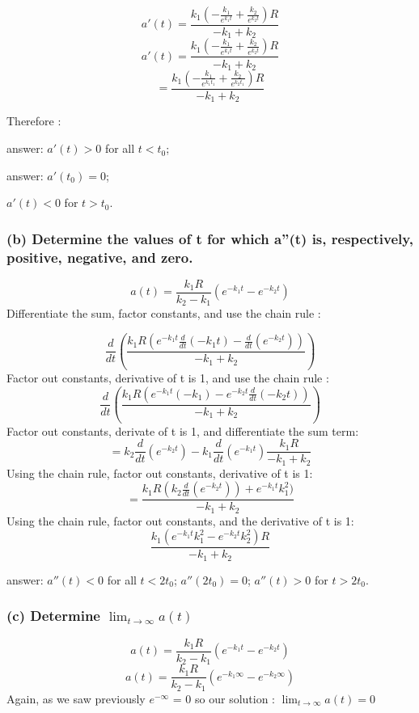 \documentclass[]{article}
\begin{document}
\[a'(t) = \frac{k_1 ( -\frac{k_1}{e^{k_1t}}+\frac{k_2}{e^{k_2t}})R}{-k_1 + k_2}\]
\[a'(t) = \frac{k_1 ( -\frac{k_1}{e^{k_1t}}+\frac{k_2}{e^{k_2t}})R}{-k_1 + k_2}\]
\[= \frac{k_1 ( -\frac{k_1}{e^{k_1 t_1}}+\frac{k_2}{e^{k_2 t_1}})R}{-k_1 + k_2}\]

Therefore :

answer: \(a'(t) > 0\) for all \(t < t_0\);

answer: \(a'(t_0) = 0\);

\(a'(t) < 0\) for \(t > t_0\).

\subsubsection{(b) Determine the values of t for which a''(t) is,
respectively, positive, negative, and
zero.}\label{b-determine-the-values-of-t-for-which-at-is-respectively-positive-negative-and-zero.}

\[a(t) = \frac{k_1 R}{k_2-k_1}(e^{-k_1t} - e^{-k_2t})\] Differentiate
the sum, factor constants, and use the chain rule :

\[\frac{d}{dt}(\frac{k_1 R(e^{-k_1t}\frac{d}{dt}(-k_1t)-\frac{d}{dt}(e^{-k_2t}))}{-k_1 + k_2})\]
Factor out constants, derivative of t is 1, and use the chain rule :
\[\frac{d}{dt}(\frac{k_1R(e^{-k_1 t}(-k_1)- e^{-k_2t}\frac{d}{dt}(-k_2t))}{-k_1 + k_2})\]
Factor out constants, derivate of t is 1, and differentiate the sum
term:
\[= k_2 \frac{d}{dt}(e^{-k_2 t})-k_1\frac{d}{dt}(e^{-k_1t})\frac{k_1R}{-k_1 + k_2}\]
Using the chain rule, factor out constants, derivative of t is 1:
\[=\frac{k_1 R (k_2 \frac{d}{dt}(e^{-k_2t}))+e^{-k_1t}k_1^2)}{-k_1 + k_2}\]
Using the chain rule, factor out constants, and the derivative of t is
1: \[\frac{k_1(e^{-k_1 t}k_1^2-e^{-k_2 t}k_2^2)R}{-k_1+k_2}\]

answer: \(a''(t) < 0\) for all \(t < 2t_0\); \(a''(2t_0) =0\);
\(a''(t) > 0\) for \(t > 2t_0\).

\subsubsection{\texorpdfstring{(c) Determine
\(\lim_{t\to\infty}a(t)\)}{(c) Determine \textbackslash{}lim\_\{t\textbackslash{}to\textbackslash{}infty\}a(t)}}\label{c-determine-lim_ttoinftyat}

\[a(t) = \frac{k_1 R}{k_2-k_1}(e^{-k_1t} - e^{-k_2t})\]
\[a(t) = \frac{k_1 R}{k_2-k_1}(e^{-k_1 \infty} - e^{-k_2 \infty})\]
Again, as we saw previously \(e^{-\infty}\) = 0 so our solution :
\(\lim_{t\to\infty}a(t) =0\)
\end{document}

